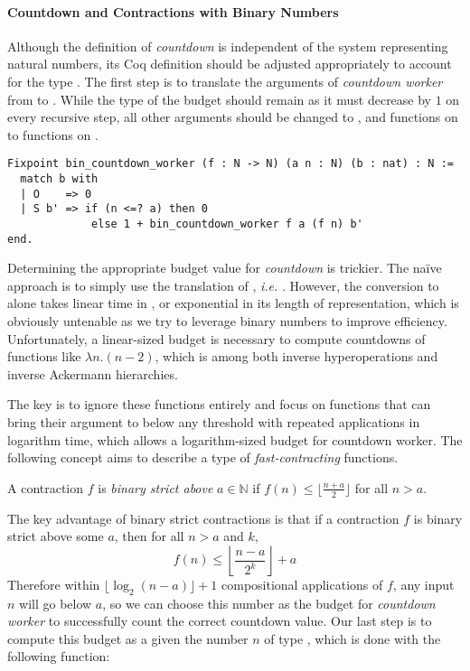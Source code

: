 \paragraph*{Countdown and Contractions with Binary Numbers}

Although the definition of \emph{countdown} is independent of the system representing natural numbers, its Coq definition should be adjusted appropriately to account for the type . The first step is to translate the arguments of \emph{countdown worker} from  to . While the type of the budget  should remain  as it must decrease by $1$ on every recursive step, all other  arguments should be changed to , and functions on  to functions on .
\begin{lstlisting}
Fixpoint bin_countdown_worker (f : N -> N) (a n : N) (b : nat) : N :=
  match b with
  | O    => 0
  | S b' => if (n <=? a) then 0
             else 1 + bin_countdown_worker f a (f n) b'
end.
\end{lstlisting}
Determining the appropriate budget value for \emph{countdown} is trickier. 
The naïve approach is to simply use the  translation of , 
\emph{i.e.} . However, the conversion to  alone 
takes linear time in , or exponential in its length of representation, 
which is obviously untenable as we try to leverage binary numbers 
to improve efficiency. 
Unfortunately, a linear-sized budget is necessary to compute countdowns of functions like $\lambda n.(n-2)$, which is among both inverse hyperoperations and inverse Ackermann hierarchies.

The key is to ignore these functions entirely and focus on functions that can bring their argument to below any threshold with repeated applications in logarithm time, which allows a logarithm-sized budget for countdown worker. The following concept aims to describe a type of \emph{fast-contracting} functions.
\begin{defn} \label{defn: bin-contraction}
	A contraction $f$ is \emph{binary strict above} $a\in \mathbb{N}$ if $f(n) \le \lfloor \frac{n + a}{2} \rfloor$ for all $n > a$.
\end{defn}
The key advantage of binary strict contractions is that if a contraction $f$ is binary strict above some $a$, then for all $n > a$ and $k$,
\begin{equation*}
f(n) \le \left\lfloor \frac{n - a}{2^k} \right\rfloor + a
\end{equation*}
Therefore within $\lfloor \log_2 (n - a) \rfloor + 1$ compositional applications of $f$, any input $n$ will go below $a$, so we can choose this number as the budget for \emph{countdown worker} to successfully count the correct countdown value. Our last step is to compute this budget as a  given the number $n$ of type , which is done with the following function:

